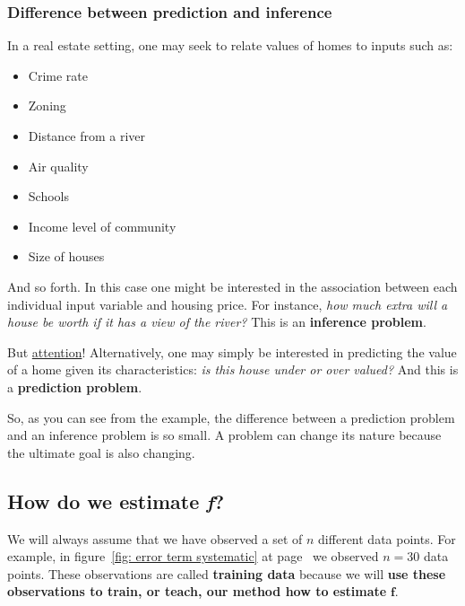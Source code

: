 \documentclass[a4paper]{article}
\newcommand{\definition}[1]{\textcolor{Red3}{\textbf{#1}}\index{#1}}
\begin{document}
    \newpage

    \subsubsection{Difference between prediction and inference}

    \begin{examplebox}
        In a real estate setting, one may seek to relate values of homes to inputs such as:
        \begin{itemize}
            \item Crime rate
            \item Zoning
            \item Distance from a river
            \item Air quality
            \item Schools
            \item Income level of community
            \item Size of houses
        \end{itemize}
        And so forth. In this case one might be interested in the association between each individual input variable and housing price. For instance, \emph{how much extra will a house be worth if it has a view of the river?} This is an \textbf{inference problem}.

        \vspace{.5em}
        But \underline{attention}! Alternatively, one may simply be interested in predicting the value of a home given its characteristics: \emph{is this house under or over valued?} And this is a \textbf{prediction problem}.
    \end{examplebox}

    So, as you can see from the example, the difference between a prediction problem and an inference problem is so small. A problem can change its nature because the ultimate goal is also changing.

    \newpage

    \subsection{How do we estimate \emph{f}?}

    We will always assume that we have observed a set of $n$ different data points. For example, in figure~\ref{fig: error term systematic} at page~\pageref{fig: error term systematic} we observed $n=30$ data points. These observations are called \definition{training data} because we will \textbf{use these observations to train, or teach, our method how to estimate} $\bm{f}$.
    
\end{document}
